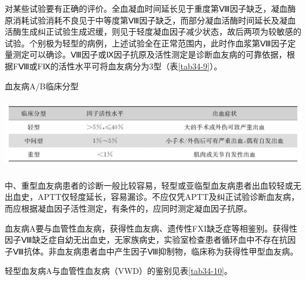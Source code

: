 对某些试验要有正确的评价。全血凝血时间延长见于重度第Ⅷ因子缺乏，凝血酶原消耗试验消耗不良见于中等度第Ⅷ因子缺乏，而部分凝血活酶时间延长及凝血活酶生成纠正试验生成迟缓，则见于轻度凝血因子减少状态，故后两项为较敏感的试验。个别极为轻型的病例，上述试验全在正常范围内，此时作血浆第Ⅷ因子定量测定可以确诊。Ⅷ因子或Ⅸ因子抗原及活性测定是诊断血友病的可靠依据，根据FⅧ或FⅨ的活性水平可将血友病分为3型（表\ref{tab34-9}）。

\begin{table}[htbp]
\centering
\caption{血友病A/B临床分型}
\label{tab34-9}
\includegraphics[width=5.97917in,height=1.21875in]{./images/Image00204.jpg}
\end{table}

中、重型血友病患者的诊断一般比较容易，轻型或亚临型血友病患者出血较轻或无出血史，APTT仅轻度延长，容易漏诊。不应仅凭APTT及纠正试验诊断血友病，而应根据凝血因子活性测定，有条件的，应同时测定凝血因子抗原。

血友病A要与血管性血友病，获得性血友病、遗传性FXI缺乏症等相鉴别。获得性因子Ⅷ缺乏症自幼无出血史，无家族病史，实验室检查患者循环血中不存在抗因子Ⅷ抗体。非血友病患者血中产生因子Ⅷ抑制物，临床称为获得性甲型血友病。

轻型血友病A与血管性血友病（VWD）的鉴别见表\ref{tab34-10}。

